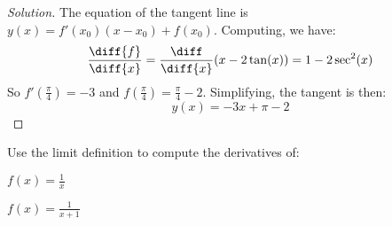 \documentclass[crop=false,class=book,oneside]{standalone}                      %
\begin{document}
            \begin{proof}[Solution]
                The equation of the tangent line is
                $y(x)=f'(x_{0})(x-x_{0})+f(x_{0})$.
                Computing, we have:
                \begin{equation*}
                    \frac{\diff{f}}{\diff{x}}
                    =\frac{\diff}{\diff{x}}(x-2\tan(x))
                    =1-2\sec^{2}(x)    
                \end{equation*}
                So $f'(\frac{\pi}{4})=-3$ and
                $f(\frac{\pi}{4})=\frac{\pi}{4}-2$.
                Simplifying, the tangent is then:
                \begin{equation*}
                    y(x)=-3x+\pi-2
                \end{equation*}
            \end{proof}
            \begin{problem}
                Use the limit definition to compute
                the derivatives of:
                \begin{enumerate}[label=(\alph*)]
                    \begin{multicols}{2}
                        \item $f(x)=\frac{1}{x}$
                        \item $f(x)=\frac{1}{x+1}$
                    \end{multicols}
                \end{enumerate}
            \end{problem}
\end{document}
